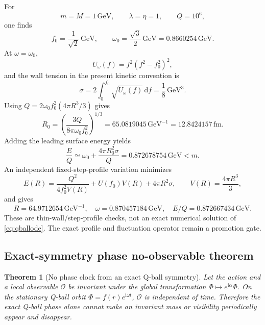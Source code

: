 \documentclass[11pt]{article}
\numberwithin{equation}{section}
\newcommand{\GeV}{\,\mathrm{GeV}}
\newcommand{\dd}{\mathrm d}
\newcommand{\ii}{\mathrm i}
\newtheorem{theorem}{Theorem}[section]
\begin{document}
For
\begin{equation}
 m=M=1\GeV,\qquad\lambda=\eta=1,\qquad Q=10^6,
\end{equation}
one finds
\begin{equation}
 f_0=\frac1{\sqrt2}\GeV,\qquad
 \omega_0=\frac{\sqrt3}{2}\GeV=0.8660254\GeV.
\end{equation}
At \(\omega=\omega_0\),
\begin{equation}
 U_\omega(f)=f^2(f^2-f_0^2)^2,
\end{equation}
and the wall tension in the present kinetic convention is
\begin{equation}
 \sigma=2\int_0^{f_0}\sqrt{U_\omega(f)}\,\dd f
 =\frac18\GeV^3.
 \label{eq:sigma}
\end{equation}
Using \(Q=2\omega_0f_0^2(4\pi R^3/3)\) gives
\begin{equation}
 R_0=\left(\frac{3Q}{8\pi\omega_0f_0^2}\right)^{1/3}
 =65.0819045\GeV^{-1}=12.8424157\,\mathrm{fm}.
\end{equation}
Adding the leading surface energy yields
\begin{equation}
 \frac EQ\simeq\omega_0+\frac{4\pi R_0^2\sigma}{Q}
 =0.872678754\GeV<m.
 \label{eq:qbenchmark}
\end{equation}
An independent fixed-step-profile variation minimizes
\begin{equation}
 E(R)=\frac{Q^2}{4f_0^2V(R)}+U(f_0)V(R)+4\pi R^2\sigma,
 \qquad V(R)=\frac{4\pi R^3}{3},
 \label{eq:stepenergy}
\end{equation}
and gives
\begin{equation}
 R=64.9712654\GeV^{-1},\quad
 \omega=0.870457184\GeV,\quad
 E/Q=0.872667434\GeV.
\end{equation}
These are thin-wall/step-profile checks, not an exact numerical solution of
\eqref{eq:qballode}.  The exact profile and fluctuation operator remain a
promotion gate.

\subsection{Exact-symmetry phase no-observable theorem}

\begin{theorem}[No phase clock from an exact Q-ball symmetry]
Let the action and a local observable \(\mathcal O\) be invariant under the
global transformation \(\Phi\mapsto e^{\ii\alpha}\Phi\).  On the stationary
Q-ball orbit \(\Phi=f(r)e^{\ii\omega t}\), \(\mathcal O\) is independent of
time.  Therefore the exact Q-ball phase alone cannot make an invariant mass
or visibility periodically appear and disappear.
\end{theorem}
\end{document}
